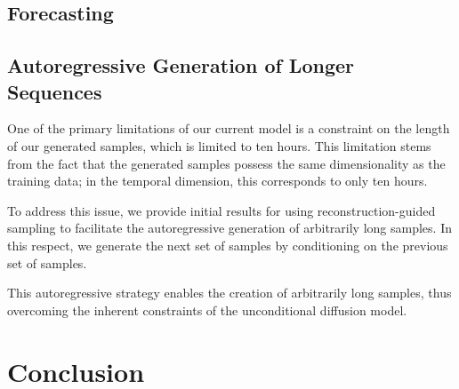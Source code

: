 \documentclass[ oneside,%
                    author={George Herbert},
                    degree={MSci},
                     title={Video Diffusion Models for Climate Simulations},
                  subtitle={}]{dissertation}
\begin{document}
\section{Forecasting}

\section{Autoregressive Generation of Longer Sequences}

One of the primary limitations of our current model is a constraint on the length of our generated samples, which is limited to ten hours. This limitation stems from the fact that the generated samples possess the same dimensionality as the training data; in the temporal dimension, this corresponds to only ten hours.

To address this issue, we provide initial results for using reconstruction-guided sampling to facilitate the autoregressive generation of arbitrarily long samples. In this respect, we generate the next set of samples by conditioning on the previous set of samples.

This autoregressive strategy enables the creation of arbitrarily long samples, thus overcoming the inherent constraints of the unconditional diffusion model.


\chapter{Conclusion}
\label{chap:conclusion}


%
%
%
\end{document}
